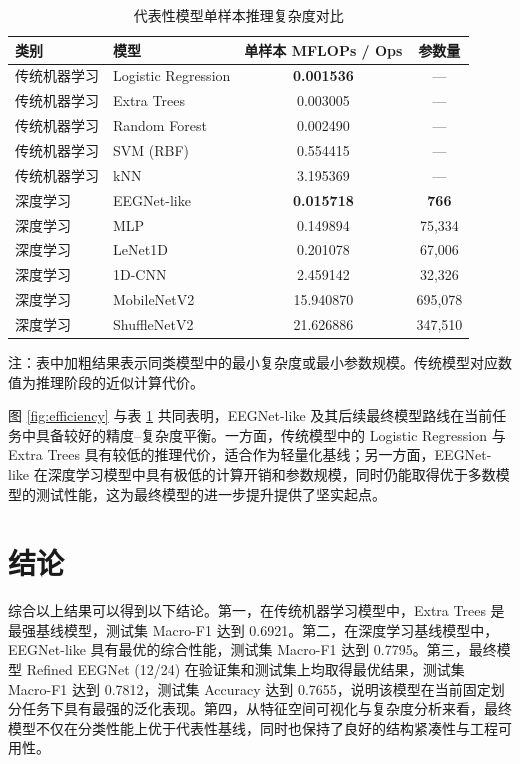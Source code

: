 \documentclass[UTF8,a4paper,12pt]{ctexart}
\begin{document}
\begin{table}[H]
\centering
\caption{代表性模型单样本推理复杂度对比}
\label{tab:complexity}
\begin{threeparttable}
\setlength{\tabcolsep}{6pt}
\begin{tabular}{llcc}
\toprule
类别 & 模型 & 单样本 MFLOPs / Ops & 参数量 \\
\midrule
传统机器学习 & Logistic Regression & \textbf{0.001536} & --- \\
传统机器学习 & Extra Trees & 0.003005 & --- \\
传统机器学习 & Random Forest & 0.002490 & --- \\
传统机器学习 & SVM (RBF) & 0.554415 & --- \\
传统机器学习 & kNN & 3.195369 & --- \\
\midrule
深度学习 & EEGNet-like & \textbf{0.015718} & \textbf{766} \\
深度学习 & MLP & 0.149894 & 75,334 \\
深度学习 & LeNet1D & 0.201078 & 67,006 \\
深度学习 & 1D-CNN & 2.459142 & 32,326 \\
深度学习 & MobileNetV2 & 15.940870 & 695,078 \\
深度学习 & ShuffleNetV2 & 21.626886 & 347,510 \\
\bottomrule
\end{tabular}
\begin{tablenotes}[flushleft]
\footnotesize
\item 注：表中加粗结果表示同类模型中的最小复杂度或最小参数规模。传统模型对应数值为推理阶段的近似计算代价。
\end{tablenotes}
\end{threeparttable}
\end{table}

图 \ref{fig:efficiency} 与表 \ref{tab:complexity} 共同表明，EEGNet-like 及其后续最终模型路线在当前任务中具备较好的精度--复杂度平衡。一方面，传统模型中的 Logistic Regression 与 Extra Trees 具有较低的推理代价，适合作为轻量化基线；另一方面，EEGNet-like 在深度学习模型中具有极低的计算开销和参数规模，同时仍能取得优于多数模型的测试性能，这为最终模型的进一步提升提供了坚实起点。

\section{结论}

综合以上结果可以得到以下结论。第一，在传统机器学习模型中，Extra Trees 是最强基线模型，测试集 Macro-F1 达到 0.6921。第二，在深度学习基线模型中，EEGNet-like 具有最优的综合性能，测试集 Macro-F1 达到 0.7795。第三，最终模型 Refined EEGNet (12/24) 在验证集和测试集上均取得最优结果，测试集 Macro-F1 达到 0.7812，测试集 Accuracy 达到 0.7655，说明该模型在当前固定划分任务下具有最强的泛化表现。第四，从特征空间可视化与复杂度分析来看，最终模型不仅在分类性能上优于代表性基线，同时也保持了良好的结构紧凑性与工程可用性。
\end{document}
